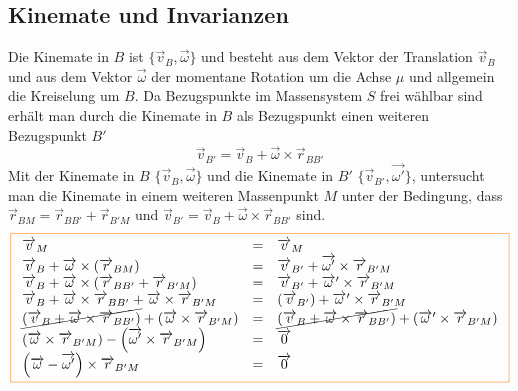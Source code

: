 \subsection{Kinemate und Invarianzen}
Die Kinemate in $B$ ist $\{\overrightarrow{v}_B, \overrightarrow{\omega}\}$ und besteht aus dem Vektor der Translation $\overrightarrow{v}_B$ und aus dem Vektor $\overrightarrow{\omega}$ der momentane Rotation um die Achse $\mu$ und allgemein die Kreiselung um $B$. 
\newline\newline
Da Bezugspunkte im Massensystem $S$ frei wählbar sind erhält man durch die Kinemate in $B$ als Bezugspunkt einen weiteren Bezugspunkt $B'$
\begin{equation} 
\boxed{\overrightarrow{v}_{B'}=\overrightarrow{v}_B+\overrightarrow{\omega}\times \overrightarrow{r}_{BB'}}
\end{equation} 
Mit der Kinemate in $B$ $\{\overrightarrow{v}_{B}, \overrightarrow{\omega}\}$ und die Kinemate in $B'$ $\{\overrightarrow{v}_{B'}, \overrightarrow{\omega'}\}$, untersucht man die Kinemate in einem weiteren Massenpunkt $M$ unter der Bedingung, dass $\overrightarrow{r}_{BM}=\overrightarrow{r}_{BB'}+\overrightarrow{r}_{B'M}$ und $\overrightarrow{v}_{B'}=\overrightarrow{v}_B+\overrightarrow{\omega}\times \overrightarrow{r}_{BB'}$ sind.
\begin{equation}
\boxed{
\begin{array}{lll}
\overrightarrow{v}_M&=&\overrightarrow{v}_M\\
\overrightarrow{v}_B+\overrightarrow{\omega}\times \left(\overrightarrow{r}_{BM}\right)&=&\overrightarrow{v}_{B'}+\overrightarrow{\omega'}\times \overrightarrow{r}_{B'M}\\
\overrightarrow{v}_B+\overrightarrow{\omega}\times \left(\overrightarrow{r}_{BB'}+\overrightarrow{r}_{B'M}\right)&=&\overrightarrow{v}_{B'}+\overrightarrow{\omega}'\times \overrightarrow{r}_{B'M}\\
\overrightarrow{v}_B+\overrightarrow{\omega}\times \overrightarrow{r}_{BB'}+\overrightarrow{\omega}\times \overrightarrow{r}_{B'M}&=&\left(\overrightarrow{v}_{B'}\right)+\overrightarrow{\omega}'\times \overrightarrow{r}_{B'M}\\
\cancel{\left(\overrightarrow{v}_B+\overrightarrow{\omega}\times \overrightarrow{r}_{BB'}\right)}+\left(\overrightarrow{\omega}\times \overrightarrow{r}_{B'M}\right)&=&\cancel{\left(\overrightarrow{v}_B+\overrightarrow{\omega}\times \overrightarrow{r}_{BB'}\right)}+\left(\overrightarrow{\omega}'\times \overrightarrow{r}_{B'M}\right)\\
\left(\overrightarrow{\omega}\times \overrightarrow{r}_{B'M}\right)-\left(\overrightarrow{\omega'}\times \overrightarrow{r}_{B'M}\right)&=&\overrightarrow{0}\\
\left(\overrightarrow{\omega}- \overrightarrow{\omega'}\right)\times \overrightarrow{r}_{B'M}&=&\overrightarrow{0}
\end{array}} 
\end{equation} 
